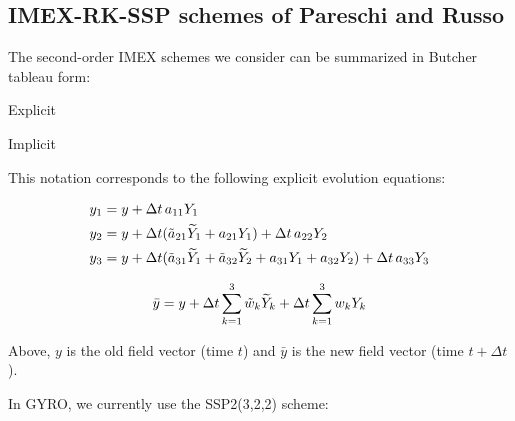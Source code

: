 \subsection{IMEX-RK-SSP schemes of Pareschi and Russo}

The second-order IMEX schemes we consider can be summarized 
in Butcher tableau form:

\begin{center}
\parbox{.25\linewidth}{
\mbox{Explicit} \par
{}}
\hskip 0.2in
\parbox{.25\linewidth}{
\mbox{Implicit} \par
{}}
\end{center}

This notation corresponds to the following explicit 
evolution equations:

%
\begin{align}
y_1 & = y + {\Delta t} \, a_{11} Y_1 \\
y_2 & = y + {\Delta t} ( {\tilde a}_{21} {\widetilde Y}_1 + a_{21} Y_1 ) 
          + {\Delta t} \, a_{22} Y_2 \\ 
y_3 & = y + {\Delta t} ( {\tilde a}_{31} {\widetilde Y}_1 + {\tilde a}_{32} {\widetilde Y}_2 
                  + a_{31} Y_1 + a_{32} Y_2 ) 
          + {\Delta t} \, a_{33} Y_3 
\end{align}

\begin{equation}
{\bar y} = y + {\Delta t} \sum_{k=1}^3 {\tilde w}_k {\widetilde Y}_k 
             + {\Delta t} \sum_{k=1}^3 w_k Y_k 
\label{newy}
\end{equation}

Above, $y$ is the old field vector (time $t$) and 
${\bar y}$ is the new field vector (time $t+\Delta t$).

In GYRO, we currently use the SSP2(3,2,2) scheme:


